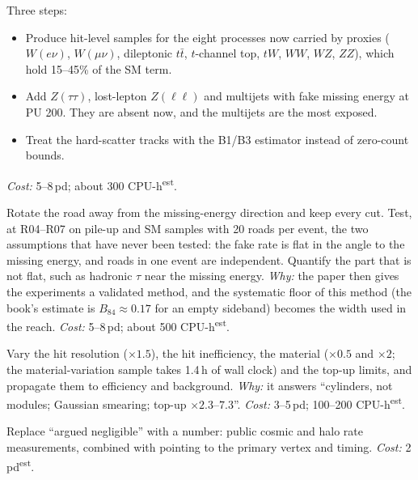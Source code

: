 \documentclass[11pt,a4paper]{article}
\newcommand{\EST}{\textsuperscript{\textsf{est}}}
\newcommand{\Bef}{B_{84}}
\newcommand{\must}{\textsf{\textbf{Must}}}
\newcommand{\should}{\textsf{Should}}
\begin{document}
\begin{description}[leftmargin=0pt,style=unboxed]
\item[B4 \must{} Complete the Standard Model background.]
  Three steps:
  \begin{itemize}
    \item Produce hit-level samples for the eight processes now carried by proxies ($W(e\nu)$, $W(\mu\nu)$, dileptonic
          $t\bar t$, $t$-channel top, $tW$, $WW$, $WZ$, $ZZ$), which hold 15--45\% of the SM term.
    \item Add $Z(\tau\tau)$, lost-lepton $Z(\ell\ell)$ and multijets with fake missing energy at PU 200. They are absent
          now, and the multijets are the most exposed.
    \item Treat the hard-scatter tracks with the B1/B3 estimator instead of zero-count bounds.
  \end{itemize}
  \emph{Cost:} 5--8\,pd; about 300 CPU-h\EST.

\item[B5 \should{} The data-driven recipe, closed in simulation.] Rotate the road away from the missing-energy direction
  and keep every cut. Test, at R04--R07 on pile-up and SM samples with 20 roads per event, the two assumptions that have
  never been tested: the fake rate is flat in the angle to the missing energy, and roads in one event are independent.
  Quantify the part that is not flat, such as hadronic $\tau$ near the missing energy. \emph{Why:} the paper then gives
  the experiments a validated method, and the systematic floor of this method (the book's estimate is $\Bef\approx0.17$
  for an empty sideband) becomes the width used in the reach. \emph{Cost:} 5--8\,pd; about 500 CPU-h\EST.

\item[B6 \should{} Detector-model robustness.] Vary the hit resolution ($\times1.5$), the hit inefficiency, the material
  ($\times0.5$ and $\times2$; the material-variation sample takes 1.4\,h of wall clock) and the top-up limits, and
  propagate them to efficiency and background. \emph{Why:} it answers ``cylinders, not modules; Gaussian smearing;
  top-up $\times2.3$--$7.3$''. \emph{Cost:} 3--5\,pd; 100--200 CPU-h\EST.

\item[B7 \should{} Cosmics and beam halo.] Replace ``argued negligible'' with a number: public cosmic and halo rate
  measurements, combined with pointing to the primary vertex and timing. \emph{Cost:} 2\,pd\EST.
\end{description}
\end{document}
